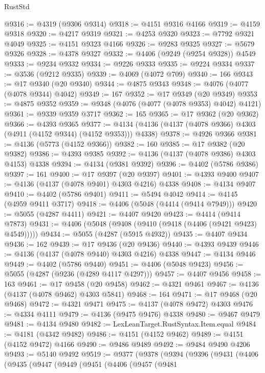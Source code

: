 \begin{lexlean}{RustStd}
\begin{coremodule}
@9316 := @4319 (@9306 @9314)
@9318 := @4151 @9316 @4166
@9319 := @4159 @9318
@9320 := @4217 @9319
@9321 := @4253 @9320
@9323 := @7792 @9321 @4049
@9325 := @4151 @9323 @4166
@9326 := @9283 @9325
@9327 := @5679 @9326
@9328 := @4378 @9327
@9332 := @4406 (@9249 (@9254 @9328)) @4549
@9333 := @9234 @9332
@9334 := @9226 @9333
@9335 := @9224 @9334
@9337 := @3536 (@9212 @9335)
@9339 := @4069 (@4072 @709)
@9340 := 166
@9343 := @17 @9340 (@20 @9340)
@9344 := @4875 @9343
@9348 := @4076 (@4077 (@4078 @9344) @4042)
@9349 := 167
@9352 := @17 @9349 (@20 @9349)
@9353 := @4875 @9352
@9359 := @9348 (@4076 (@4077 (@4078 @9353) @4042) @4121)
@9361 := @9339 @9359 @3717
@9362 := 165
@9365 := @17 @9362 (@20 @9362)
@9366 := @4393 @9365
@9377 := @4134 (@4136 (@4137 (@4078 @9366) @4303 (@4911 (@4152 @9344) (@4152 @9353))) @4338)
@9378 := @4926 @9366
@9381 := @4136 (@5773 (@4152 @9366))
@9382 := 160
@9385 := @17 @9382 (@20 @9382)
@9386 := @4393 @9385
@9392 := @4136 (@4137 (@4078 @9386) @4303 @4153) @4338
@9394 := @4134 (@9381 @9392)
@9396 := @4402 (@5786 @9386)
@9397 := 161
@9400 := @17 @9397 (@20 @9397)
@9401 := @4393 @9400
@9407 := @4136 (@4137 (@4078 @9401) @4303 @4216) @4338
@9408 := @4134 @9407
@9410 := @4402 (@5786 @9401)
@9411 := @5494 @4042
@9414 := @4145 (@4959 @9411 @3717)
@9418 := @4406 (@5048 (@4414 (@9414 @7949)))
@9420 := @5055 (@4287 @4411)
@9421 := @4407 @9420
@9423 := @4414 (@9414 @7873)
@9431 := @4406 (@5048 (@9408 (@9410 (@9418 (@4406 (@9421 @9423) @4549)))))
@9434 := @5055 (@4287 (@5915 @4932))
@9435 := @4407 @9434
@9436 := 162
@9439 := @17 @9436 (@20 @9436)
@9440 := @4393 @9439
@9446 := @4136 (@4137 (@4078 @9440) @4303 @4216) @4338
@9447 := @4134 @9446
@9449 := @4402 (@5786 @9440)
@9451 := @4406 (@5048 @9423)
@9456 := @5055 (@4287 (@9236 (@4289 @4117 @4297)))
@9457 := @4407 @9456
@9458 := 163
@9461 := @17 @9458 (@20 @9458)
@9462 := @4321 @9461
@9467 := @4136 (@4137 (@4078 @9462) @4303 @5841)
@9468 := 164
@9471 := @17 @9468 (@20 @9468)
@9472 := @4321 @9471
@9475 := @4137 (@4078 @9472) @4303
@9476 := @4334 @4111
@9479 := @4136 (@9475 @9476) @4338
@9480 := @9467 @9479
@9481 := @4134 @9480
@9482 := LexLeanTarget.RustSyntax.Item.equal
@9484 := @4181 (@4342 @9482)
@9486 := @4151 (@4152 @9462)
@9489 := @4151 (@4152 @9472) @4166
@9490 := @9486 @9489
@9492 := @9484 @9490 @4206
@9493 := @5140 @9492
@9519 := @9377
    (@9378
      (@9394
        (@9396
          (@9431
            (@4406
              (@9435
                (@9447
                  (@9449
                    (@9451
                      (@4406
                        (@9457
                          (@9481

\end{coremodule}
\end{lexlean}
